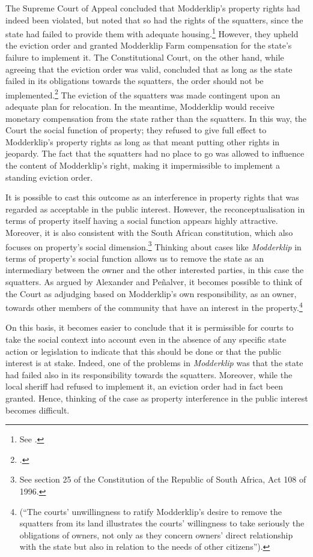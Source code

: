 The Supreme Court of Appeal concluded that Modderklip's property rights had indeed been violated, but noted that so had the rights of the squatters, since the state had failed to provide them with adequate housing.\footnote{See \cite{modderklip04}.} However, they upheld the eviction order and granted Modderklip Farm compensation for the state's failure to implement it. The Constitutional Court, on the other hand, while agreeing that the eviction order was valid, concluded that as long as the state failed in its obligations towards the squatters, the order should not be implemented.\footcite{modderklip05} The eviction of the squatters was made contingent upon an adequate plan for relocation. In the meantime, Modderklip would receive monetary compensation from the state rather than the squatters. In this way, the Court  the social function of property; they refused to give full effect to Modderklip's property rights as long as that meant putting other rights in jeopardy. The fact that the squatters had no place to go was allowed to influence the content of Modderklip's right, making it impermissible to implement a standing eviction order.

It is possible to cast this outcome as an interference in property rights that was regarded as acceptable in the public interest. However, the reconceptualisation in terms of property itself having a social function appears highly attractive. Moreover, it is also consistent with the South African constitution, which also focuses on property's social dimension.\footnote{See section 25 of the Constitution of the Republic of South Africa, Act 108 of 1996.} Thinking about cases like {\it Modderklip} in terms of property's social function allows us to remove the state as an intermediary between the owner and the other interested parties, in this case the squatters. As argued by Alexander and Pe\~{n}alver, it becomes possible to think of the Court as adjudging based on Modderklip's own responsibility, as an owner, towards other members of the community that have an interest in the property.\footnote{\cite[157]{alexander11} (``The courts' unwillingness to ratify Modderklip's desire to remove the squatters from its land illustrates the courts' willingness to take seriously the obligations of owners, not only as they concern owners' direct relationship with the state but also in relation to the needs of other citizens'').}

On this basis, it becomes easier to conclude that it is permissible for courts to take the social context into account even in the absence of any specific state action or legislation to indicate that this should be done or that the public interest is at stake. Indeed, one of the problems in {\it Modderklip} was that the state had failed also in its responsibility towards the squatters. Moreover, while the local sheriff had refused to implement it, an eviction order had in fact been granted. Hence, thinking of the case as property interference in the public interest becomes difficult.

